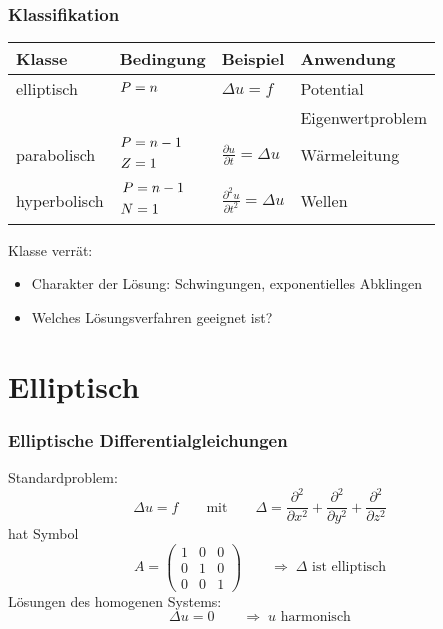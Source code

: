 \begin{frame}
\frametitle{Klassifikation}

\begin{center}
\begin{tabular}{llll}
Klasse&Bedingung&Beispiel&Anwendung\\
\hline
elliptisch &$\begin{aligned}P&=n\mathstrut\end{aligned}$
	&$\displaystyle \Delta u=f                                $
		&Potential\\
&	&	&Eigenwertproblem\\
\hline
parabolisch&%
$\begin{aligned}P&=n-1\mathstrut\\Z&=1\mathstrut\end{aligned}$
	&$\displaystyle \frac{\partial u}{\partial t}=\Delta u    $
		&Wärmeleitung\\
\hline
hyperbolisch&%
$\begin{aligned}P&=n-1\mathstrut\\N&=1\mathstrut\end{aligned}$
	&$\displaystyle \frac{\partial^2 u}{\partial t^2}=\Delta u$
		&Wellen\\
\hline
\end{tabular}
\end{center}

Klasse verrät:
\begin{itemize}
\item Charakter der Lösung: Schwingungen, exponentielles Abklingen
\item Welches Lösungsverfahren geeignet ist?
\end{itemize}

\end{frame}

\section{Elliptisch}

\begin{frame}
\frametitle{Elliptische Differentialgleichungen}
Standardproblem:
\[
\Delta u = f
\qquad\text{mit}\qquad
\Delta 
=
\frac{\partial^2}{\partial x^2}
+
\frac{\partial^2}{\partial y^2}
+
\frac{\partial^2}{\partial z^2}
\]
hat Symbol
\[
A=\begin{pmatrix}1&0&0\\0&1&0\\0&0&1\end{pmatrix}
\qquad
\Rightarrow
\;
\text{$\Delta$ ist elliptisch}
\]
Lösungen des homogenen Systems:
\[
\Delta u=0
\qquad\Rightarrow\;
\text{$u$ harmonisch}
\]
\end{frame}

